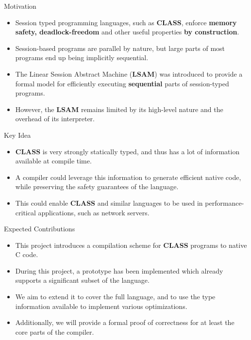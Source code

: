 \documentclass{beamer}
\begin{document}
\begin{frame}{Motivation}
  \begin{itemize}
    \item Session typed programming languages, such as \textbf{CLASS}, enforce \textbf{memory safety, deadlock-freedom} and other useful properties \textbf{by construction}.
    \item Session-based programs are parallel by nature, but large parts of most programs end up being implicitly sequential.
    \item The Linear Session Abstract Machine (\textbf{LSAM}) was introduced to provide a formal model for efficiently executing \textbf{sequential} parts of session-typed programs.
    \item However, the \textbf{LSAM} remains limited by its high-level nature and the overhead of its interpreter.
  \end{itemize}
\end{frame}

\begin{frame}{Key Idea}

  \begin{itemize}
    \item \textbf{CLASS} is very strongly statically typed, and thus has a lot of information available at compile time.
    \item A compiler could leverage this information to generate efficient native code, while preserving the safety guarantees of the language.
    \item This could enable \textbf{CLASS} and similar languages to be used in performance-critical applications, such as network servers.
  \end{itemize}

\end{frame}

\begin{frame}{Expected Contributions}

  \begin{itemize}
    \item This project introduces a compilation scheme for \textbf{CLASS} programs to native C code.
    \item During this project, a prototype has been implemented which already supports a significant subset of the language.
    \item We aim to extend it to cover the full language, and to use the type information available to implement various optimizations.
    \item Additionally, we will provide a formal proof of correctness for at least the core parts of the compiler.
  \end{itemize}

\end{frame}
\end{document}
